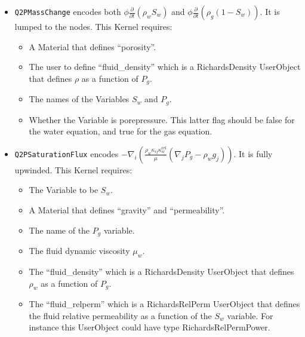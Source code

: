 \documentclass[]{scrreprt}
\begin{document}
\begin{itemize}

\item {\tt Q2PMassChange} encodes both $\phi \frac{\partial}{\partial t}
  \left( \rho_{w} S_{w} \right)$ and $\phi \frac{\partial}{\partial t}
  \left( \rho_{g} (1 - S_{w}) \right)$.  It is lumped to the nodes.
  This Kernel requires:
\begin{itemize}
\item A Material that defines ``porosity''.
\item The user to define ``fluid\_density'' which is a RichardsDensity
  UserObject that defines $\rho$ as a function of $P_{g}$.
\item The names of the Variables $S_{w}$ and $P_{g}$.
\item Whether the Variable is porepressure.  This latter flag should
  be false for the water equation, and true for the gas equation.
\end{itemize}

\item {\tt Q2PSaturationFlux} encodes $ - \nabla_{i}
\left( \frac{\rho_{w} \kappa_{ij}\kappa_{w}^{\mathrm{rel}}}{\mu}
(\nabla_{j}P_{g} - \rho_{w} g_{j}) \right)$.  It is fully upwinded.
This Kernel requires:
\begin{itemize}
\item The Variable to be $S_{w}$.
\item A Material that defines ``gravity'' and ``permeability''.
\item The name of the $P_{g}$ variable.
\item The fluid dynamic viscosity $\mu_{w}$.
\item The ``fluid\_density'' which is a RichardsDensity
  UserObject that defines $\rho_{w}$ as a function of $P_{g}$.
\item The ``fluid\_relperm'' which is a RichardsRelPerm UserObject that
  defines the fluid relative permeability as a function of the $S_{w}$
  variable.  For instance this UserObject could have type
  RichardsRelPermPower.
\end{itemize}


\end{itemize}
\end{document}
